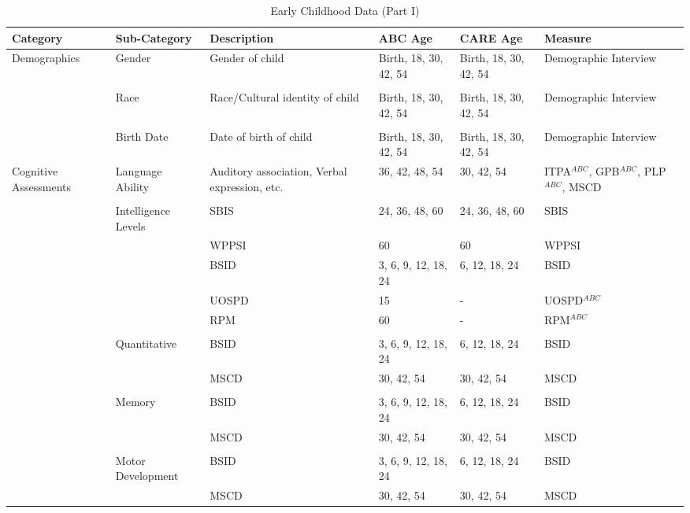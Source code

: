 \begin{sidewaystable}[H]
\small
\caption{Early Childhood Data (Part I)}
\label{tab:ecvars_1}
\centering
\begin{adjustbox}{max width=\textwidth, max height=\textheight,keepaspectratio}
\begin{threeparttable}
\tiny
\begin{tabular}{L{3cm} C{3.5cm} C{4cm} C{1.5cm} C{1.5cm}  C{6cm}}
\toprule
\textbf{Category}	&	\textbf{Sub-Category}	&	\textbf{Description}	&	\textbf{ABC Age}  	&  \textbf{CARE Age}  & 	\textbf{Measure}	\\ \midrule
Demographics	&	Gender	&	Gender of child	&	Birth, 18, 30, 42, 54	&	 Birth, 18, 30, 42, 54	&	Demographic Interview	\\
	&	\\
	&	Race	&	Race/Cultural identity of child	&	Birth, 18, 30, 42, 54	&	 Birth, 18, 30, 42, 54	&	 Demographic Interview\\
	&	\\
	&	Birth Date	&	Date of birth of child	&	Birth, 18, 30, 42, 54	& 	Birth, 18, 30, 42, 54	&	 Demographic Interview	\\ \midrule
Cognitive Assessments	&	Language Ability	&	Auditory association, Verbal expression, etc. 	&	36, 42, 48, 54	&	30, 42, 54	&	ITPA$^{ABC}$, GPB$^{ABC}$, PLP$^{ABC}$, MSCD \\
	&	\\
	&	Intelligence Levels	&	SBIS 	&	24, 36, 48, 60	&	24, 36, 48, 60	&	SBIS	\\
	&		&	WPPSI	&	60	&	60	&	WPPSI	\\
	&		&	BSID 	&	3, 6, 9, 12, 18, 24	&	6, 12, 18, 24		&	BSID	\\
	&		&	UOSPD	&	15	&	- 	&	UOSPD$^{ABC}$	\\
	&		&	RPM	&	60	&	-	&	RPM$^{ABC}$	\\
	&	\\
	&	Quantitative	 &	BSID 	&	3, 6, 9, 12, 18, 24	&	6, 12, 18, 24		&	BSID	\\
	&		&	MSCD 	&	30, 42, 54		&	30, 42, 54	&	MSCD	\\
	&	\\
	&	Memory	&	BSID 	&	3, 6, 9, 12, 18, 24	& 	6, 12, 18, 24		&	BSID	\\
	&		&	MSCD 	&	30, 42, 54	&	30, 42, 54	&	MSCD	\\
	&	\\
	&	Motor Development	&	BSID 	&	3, 6, 9, 12, 18, 24	&	6, 12, 18, 24		&	BSID\\
	&		&	MSCD 	&	30, 42, 54	&	30, 42, 54	&	MSCD	\\

\end{tabular}
\end{threeparttable}
\end{adjustbox}
\end{sidewaystable}

